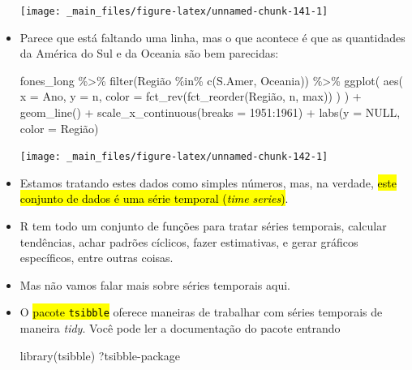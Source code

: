 \documentclass[
  11pt]{report}
\newenvironment{Shaded}{\begin{snugshade}}{\end{snugshade}}
\newcommand{\AttributeTok}[1]{\textcolor[rgb]{0.77,0.63,0.00}{#1}}
\newcommand{\ConstantTok}[1]{\textcolor[rgb]{0.00,0.00,0.00}{#1}}
\newcommand{\DecValTok}[1]{\textcolor[rgb]{0.00,0.00,0.81}{#1}}
\newcommand{\FunctionTok}[1]{\textcolor[rgb]{0.00,0.00,0.00}{#1}}
\newcommand{\NormalTok}[1]{#1}
\newcommand{\SpecialCharTok}[1]{\textcolor[rgb]{0.00,0.00,0.00}{#1}}
\newcommand{\StringTok}[1]{\textcolor[rgb]{0.31,0.60,0.02}{#1}}
\renewenvironment{Shaded}{
    \begin{mdframed}[%
      roundcorner=2pt,%
      innerleftmargin=5pt,%
      innerrightmargin=5pt,%
      topline=true,%
      leftline=true,%
      rightline=true,%
      bottomline=true,%
      linewidth=0.5pt,%
      linecolor=black!20,%
      backgroundcolor=black!2,%
      skipabove=2ex,%
      skipbelow=2.5ex%
    ]%
  }
  {
    \end{mdframed}
  }
\begin{document}
\begin{itemize}
  \begin{center}\texttt{[image: \_main\_files/figure-latex/unnamed-chunk-141-1]} \end{center}
\item
  Parece que está faltando uma linha, mas o que acontece é que as quantidades da América do Sul e da Oceania são bem parecidas:

\begin{Shaded}
\begin{Highlighting}[]
\NormalTok{fones\_long }\SpecialCharTok{\%\textgreater{}\%}
  \FunctionTok{filter}\NormalTok{(Região }\SpecialCharTok{\%in\%} \FunctionTok{c}\NormalTok{(}\StringTok{\textquotesingle{}S.Amer\textquotesingle{}}\NormalTok{, }\StringTok{\textquotesingle{}Oceania\textquotesingle{}}\NormalTok{)) }\SpecialCharTok{\%\textgreater{}\%} 
  \FunctionTok{ggplot}\NormalTok{(}
    \FunctionTok{aes}\NormalTok{(}
      \AttributeTok{x =}\NormalTok{ Ano, }
      \AttributeTok{y =}\NormalTok{ n, }
      \AttributeTok{color =} \FunctionTok{fct\_rev}\NormalTok{(}\FunctionTok{fct\_reorder}\NormalTok{(Região, n, max))}
\NormalTok{    )}
\NormalTok{  ) }\SpecialCharTok{+}
    \FunctionTok{geom\_line}\NormalTok{() }\SpecialCharTok{+}
    \FunctionTok{scale\_x\_continuous}\NormalTok{(}\AttributeTok{breaks =} \DecValTok{1951}\SpecialCharTok{:}\DecValTok{1961}\NormalTok{) }\SpecialCharTok{+}
    \FunctionTok{labs}\NormalTok{(}\AttributeTok{y =} \ConstantTok{NULL}\NormalTok{, }\AttributeTok{color =} \StringTok{\textquotesingle{}Região\textquotesingle{}}\NormalTok{)}
\end{Highlighting}
\end{Shaded}

  \begin{center}\texttt{[image: \_main\_files/figure-latex/unnamed-chunk-142-1]} \end{center}
\item
  Estamos tratando estes dados como simples números, mas, na verdade, {\hl{este conjunto de dados é uma série temporal (\emph{time series})}}.
\item
  R tem todo um conjunto de funções para tratar séries temporais, calcular tendências, achar padrões cíclicos, fazer estimativas, e gerar gráficos específicos, entre outras coisas.
\item
  Mas não vamos falar mais sobre séries temporais aqui.
\item
  O {\hl{pacote {\mbox{\texttt{tsibble}}}}} oferece maneiras de trabalhar com séries temporais de maneira \emph{tidy}. Você pode ler a documentação do pacote entrando

\begin{Shaded}
\begin{Highlighting}[]
\FunctionTok{library}\NormalTok{(tsibble)}
\NormalTok{?}\StringTok{\textasciigrave{}}\AttributeTok{tsibble{-}package}\StringTok{\textasciigrave{}}
\end{Highlighting}
\end{Shaded}
\end{itemize}
\end{document}
